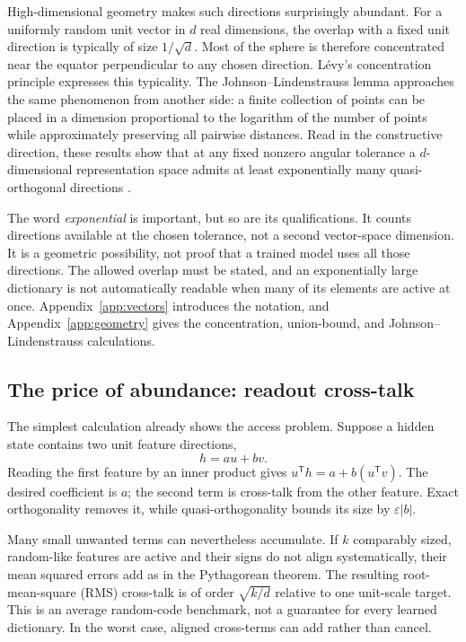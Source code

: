 \documentclass[
  aps,
  reprint,
  superscriptaddress,
  floatfix,
  nofootinbib,
  longbibliography
]{revtex4-2}
\newcommand{\T}{^{\mathsf T}}
\begin{document}
High-dimensional geometry makes such directions surprisingly abundant.
For a uniformly random unit vector in $d$ real dimensions, the overlap with a
fixed unit direction is typically of size $1/\sqrt d$.  Most of the sphere is
therefore concentrated near the equator perpendicular to any chosen
direction.  L\'evy's concentration principle expresses this typicality.
The Johnson--Lindenstrauss lemma approaches the same phenomenon from another
side: a finite collection of points can be placed in a dimension proportional
to the logarithm of the number of points while approximately preserving all
pairwise distances.  Read in the constructive direction, these results show
that at any fixed nonzero angular tolerance a $d$-dimensional representation
space admits
at least exponentially many quasi-orthogonal directions
\cite{ledoux2001concentration,johnson-1984,Dasgupta-2003}.

The word \emph{exponential} is important, but so are its qualifications.  It
counts directions available at the chosen tolerance, not a second
vector-space dimension.  It is a geometric possibility, not proof that a
trained model uses all those directions.  The allowed overlap must be stated,
and an exponentially large dictionary is not automatically readable when
many of its elements are active at once.  Appendix~\ref{app:vectors}
introduces the notation, and Appendix~\ref{app:geometry} gives the
concentration, union-bound, and Johnson--Lindenstrauss calculations.

\subsection{The price of abundance: readout cross-talk}

The simplest calculation already shows the access problem.  Suppose a hidden
state contains two unit feature directions,
\begin{equation}
 h=a u+b v.
 \label{eq:two-feature-main}
\end{equation}
Reading the first feature by an inner product gives
$u\T h=a+b(u\T v)$.  The desired coefficient is $a$; the second term is
cross-talk from the other feature.  Exact orthogonality removes it, while
quasi-orthogonality bounds its size by $\varepsilon|b|$.

Many small unwanted terms can nevertheless accumulate.  If $k$ comparably
sized, random-like features are active and their signs do not align
systematically, their mean squared errors add as in the Pythagorean theorem.
The resulting root-mean-square (RMS) cross-talk is of order
$\sqrt{k/d}$ relative to one unit-scale target.  This is an average random-code
benchmark, not a guarantee for every learned dictionary.  In the worst case,
aligned cross-terms can add rather than cancel.
\end{document}
